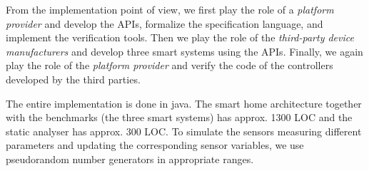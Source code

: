\documentclass{article}
\begin{document}
From the implementation point of view, we first play the role of a \textit{platform provider} and develop the APIs, formalize the specification language, and implement the verification tools. Then we play the role of the \textit{third-party device manufacturers} and develop three smart systems using the APIs. Finally, we again play the role of the \textit{platform provider} and verify  the code of the controllers developed by the third parties.

The entire implementation is done in java. The smart home architecture together with the benchmarks (the three smart systems) has approx. 1300 LOC and the static analyser has approx. 300 LOC. To simulate the sensors measuring different parameters and updating the corresponding sensor variables, we use pseudorandom number generators in appropriate ranges. \\
\end{document}

